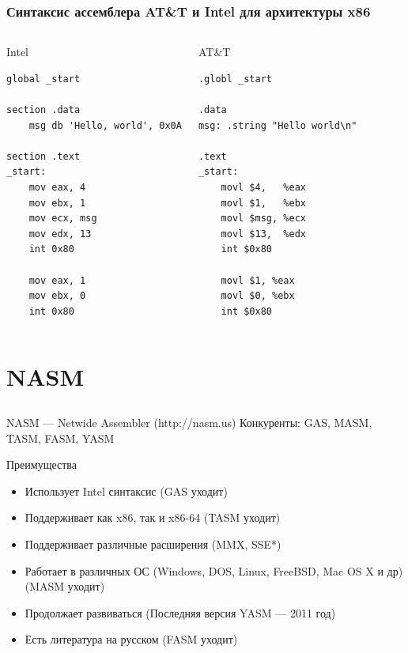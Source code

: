 \documentclass{beamer}
\begin{document}
    \begin{frame}[fragile]
        \frametitle{Синтаксис ассемблера AT\&T и Intel для архитектуры x86}
        \begin{columns}
            \begin{block}{Intel}\footnotesize
            \begin{verbatim}
global _start 

section .data
    msg db 'Hello, world', 0x0A

section .text
_start:
    mov eax, 4
    mov ebx, 1
    mov ecx, msg
    mov edx, 13
    int 0x80
    
    mov eax, 1
    mov ebx, 0
    int 0x80
            \end{verbatim}
            \end{block}
            \begin{block}{AT\&T}\footnotesize
            \begin{verbatim}
.globl _start

.data
msg: .string "Hello world\n"

.text
_start:
    movl $4,   %eax
    movl $1,   %ebx
    movl $msg, %ecx
    movl $13,  %edx
    int $0x80

    movl $1, %eax
    movl $0, %ebx
    int $0x80
            \end{verbatim}
            \end{block}
        \end{columns}    
\end{frame}
    \section{NASM}
    \subsection{}
    \begin{frame}{NASM --- Netwide Assembler (http://nasm.us)}
    Конкуренты: GAS, MASM, TASM, FASM, YASM
        \begin{block}{Преимущества}
            \begin{itemize}
                \item Использует Intel синтаксис (GAS уходит)
                \item Поддерживает как x86, так и x86-64 (TASM уходит)
                \item Поддерживает различные расширения (MMX, SSE*)
                \item Работает в различных ОС (Windows, DOS, Linux, FreeBSD, Mac OS X и др) (MASM уходит)
                \item Продолжает развиваться (Последняя версия YASM --- 2011 год)
                \item Есть литература на русском (FASM уходит) 
            \end{itemize}
        \end{block}
    \end{frame}
\end{document}
